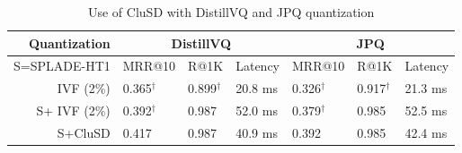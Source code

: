 

\begin{table}[htbp]
        \centering
                \resizebox{\columnwidth}{!} {%
                \begin{tabular}{ r |l l l |ll l}
                        \hline\hline
                Quantization & \multicolumn{3}{c|}{\bf{DistillVQ}} & \multicolumn{3}{c}{\bf{JPQ}}   \\
                        \hline
S=SPLADE-HT1                        & {MRR@10} & {R@1K}  & {Latency } & {MRR@10} & {R@1K}    & {Latency}\\
                        \hline
                        IVF (2\%)  & 0.365$^\dag$ &	0.899$^\dag$ &	20.8 ms
& 0.326$^\dag$	&0.917$^\dag$ &	21.3 ms\\
S+ IVF (2\%)	&0.392$^\dag$ &	0.987&	52.0 ms
& 0.379$^\dag$ & 	0.985& 	52.5 ms\\
S+CluSD&	 0.417 &	0.987 &	40.9 ms
 &0.392 &	0.985 &	42.4 ms\\
\hline           
\hline           
                \end{tabular}
                }
        \caption{ Use of CluSD with   DistillVQ and JPQ quantization}
\vspace*{-5mm}  
        \label{tab:compress}
\end{table}     

